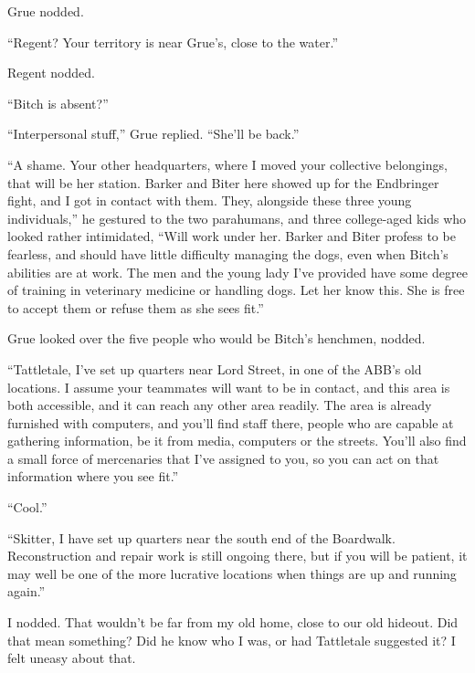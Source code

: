 Grue nodded.



``Regent?  Your territory is near Grue's, close to the water.''



Regent nodded.



``Bitch is absent?''



``Interpersonal stuff,'' Grue replied.  ``She'll be back.''



``A shame.  Your other headquarters, where I moved your collective belongings, that will be her station.  Barker and Biter here showed up for the Endbringer fight, and I got in contact with them.  They, alongside these three young individuals,'' he gestured to the two parahumans, and three college-aged kids who looked rather intimidated, ``Will work under her.  Barker and Biter profess to be fearless, and should have little difficulty managing the dogs, even when Bitch's abilities are at work.  The men and the young lady I've provided have some degree of training in veterinary medicine or handling dogs.  Let her know this.  She is free to accept them or refuse them as she sees fit.''



Grue looked over the five people who would be Bitch's henchmen, nodded.



``Tattletale, I've set up quarters near Lord Street, in one of the ABB's old locations.  I assume your teammates will want to be in contact, and this area is both accessible, and it can reach any other area readily.  The area is already furnished with computers, and you'll find staff there, people who are capable at gathering information, be it from media, computers or the streets.  You'll also find a small force of mercenaries that I've assigned to you, so you can act on that information where you see fit.''



``Cool.''



``Skitter, I have set up quarters near the south end of the Boardwalk.  Reconstruction and repair work is still ongoing there, but if you will be patient, it may well be one of the more lucrative locations when things are up and running again.''



I nodded.  That wouldn't be far from my old home, close to our old hideout.  Did that mean something?  Did he know who I was, or had Tattletale suggested it?  I felt uneasy about that.



